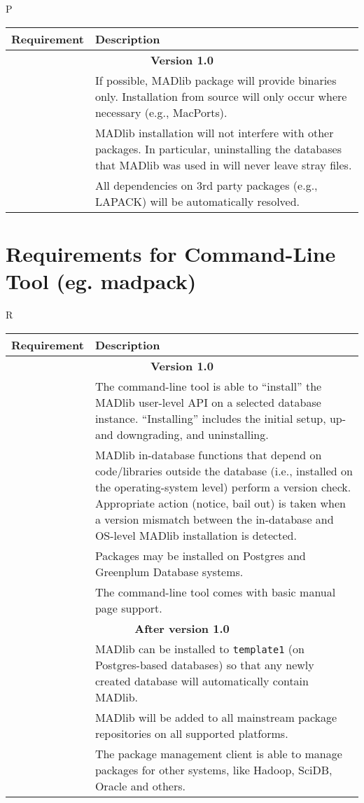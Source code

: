 \documentclass[11pt]{article}
\begin{document}
{\begin{mlreq}{P}
\begin{tabular}{|l|p{133mm}|}
\hline
	\textbf{Requirement} & \textbf{Description} \\
\hline
	\multicolumn{2}{|c|}{\bf Version 1.0} \\
\hline
	\mlr & If possible, MADlib package will provide binaries only. Installation from source will only occur where necessary (e.g., MacPorts). \\
\hline
	\mlr & MADlib installation will not interfere with other packages. In particular, uninstalling the databases that MADlib was used in will never leave stray files. \\
\hline
	\mlr & All dependencies  on 3rd party packages (e.g., LAPACK) will be automatically resolved. \\
\hline

\end{tabular}
\end{mlreq}

\section{Requirements for Command-Line Tool (eg. madpack)}
	
\begin{mlreq}{R}
\begin{tabular}{|l|p{133mm}|}
\hline
	\textbf{Requirement} & \textbf{Description} \\
\hline
	\multicolumn{2}{|c|}{\bf Version 1.0} \\
\hline
	\mlr & The command-line tool is able to ``install'' the MADlib user-level API on a selected database instance. ``Installing'' includes the initial setup, up\nobreakdash- and downgrading, and uninstalling. \\
\hline
	\mlr & MADlib in-database functions that depend on code/libraries outside the database (i.e., installed on the operating-system level) perform a version check. Appropriate action (notice, bail out) is taken when a version mismatch between the in-database and OS-level MADlib installation is detected. \\
\hline
	\mlr & Packages may be installed on Postgres and Greenplum Database systems. \\
\hline
	\mlr & The command-line tool comes with basic manual page support.\\
\hline
	\multicolumn{2}{|c|}{\bf After version 1.0} \\
\hline
	\mlr & MADlib can be installed to \texttt{template1} (on Postgres-based databases) so that any
newly created database will automatically contain MADlib. \\
\hline
	\mlr & MADlib will be added to all mainstream package repositories on all supported platforms. \\
\hline
	\mlr & The package management client is able to manage packages for other
		   systems, like Hadoop, SciDB, Oracle and others. \\
\hline


\end{tabular}
\end{mlreq}}
\end{document}
